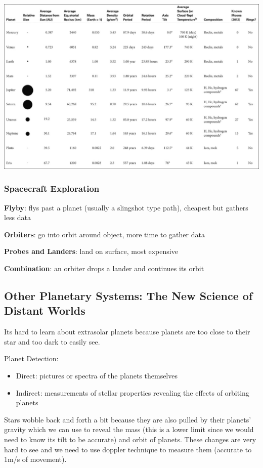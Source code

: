 \documentclass[12pt]{article}
\begin{document}
\includegraphics[angle=90,scale=0.5]{planetData}

\subsubsection{Spacecraft Exploration}
\textbf{Flyby}: flys past a planet (usually a slingshot type path), cheapest but gathers less data

\textbf{Orbiters}: go into orbit around object, more time to gather data

\textbf{Probes and Landers}: land on surface, most expensive

\textbf{Combination}: an orbiter drops a lander and continues its orbit

\subsection{Other Planetary Systems: The New Science of Distant Worlds}
Its hard to learn about extrasolar planets because planets are too close to their star and too dark to easily see.


Planet Detection:
\begin{itemize}
    \item Direct: pictures or spectra of the planets themselves
    \item Indirect: measurements of stellar properties revealing the effects of orbiting planets
\end{itemize}


Stars wobble back and forth a bit because they are also pulled by their planets' gravity which we can use to reveal the mass (this is a lower limit since we would need to know its tilt to be accurate) and orbit of planets. These changes are very hard to see and we need to use doppler technique to measure them (accurate to 1m/s of movement).
\end{document}
